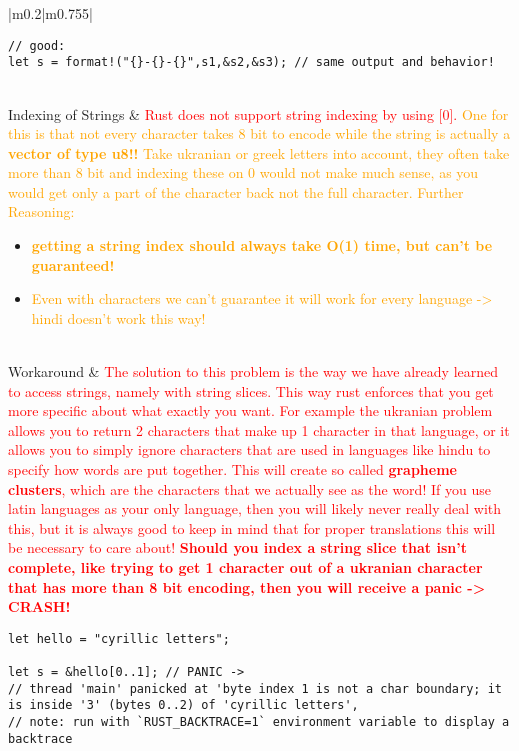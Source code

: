 \documentclass[main.tex,fontsize=8pt,paper=a4,paper=portrait,DIV=calc,]{scrartcl}
\begin{document}
\begin{table}[ht!]
\begin{tabular}{|m{0.2\linewidth}|m{0.755\linewidth}|}
\begin{lstlisting}
// good:
let s = format!("{}-{}-{}",s1,&s2,&s3); // same output and behavior!
\end{lstlisting}\\
\hline
Indexing of Strings & 
\textcolor{red}{Rust does not support string indexing by using [0].}\newline
\textcolor{orange}{One for this is that not every character takes 8 bit to encode while the string is actually a \textbf{vector of type u8!!} Take ukranian or greek letters into account, they often take more than 8 bit and indexing these on 0 would not make much sense, as you would get only a part of the character back not the full character.}\newline
\textcolor{orange}{Further Reasoning:}\newline
\begin{itemize}
\item \textcolor{orange}{\textbf{getting a string index should always take O(1) time, but can't be guaranteed!}}
\item \textcolor{orange}{Even with characters we can't guarantee it will work for every language -> hindi doesn't work this way!}
\end{itemize}\\ 
\hline
Workaround & 
\textcolor{red}{The solution to this problem is the way we have already learned to access strings, namely with string slices. This way rust enforces that you get more specific about what exactly you want. For example the ukranian problem allows you to return 2 characters that make up 1 character in that language, or it allows you to simply ignore characters that are used in languages like hindu to specify how words are put together. This will create so called \textbf{grapheme clusters}, which are the characters that we actually see as the word!\newline
If you use latin languages as your only language, then you will likely never really deal with this, but it is always good to keep in mind that for proper translations this will be necessary to care about!\newline
\textbf{Should you index a string slice that isn't complete, like trying to get 1 character out of a ukranian character that has more than 8 bit encoding, then you will receive a panic -> CRASH!}}\newline
\begin{lstlisting}
let hello = "cyrillic letters";

let s = &hello[0..1]; // PANIC -> 
// thread 'main' panicked at 'byte index 1 is not a char boundary; it is inside '3' (bytes 0..2) of 'cyrillic letters',
// note: run with `RUST_BACKTRACE=1` environment variable to display a backtrace
\end{lstlisting}\\
\hline
\end{tabular}
\end{table}
\end{document}
